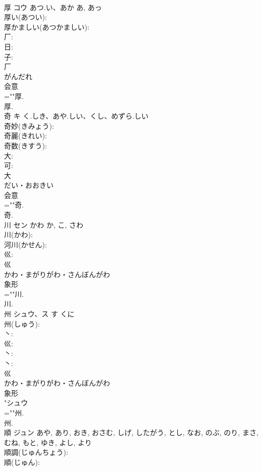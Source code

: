 \documentclass[8pt]{extreport}
\begin{document}
\begin{CJK}{UTF8}{min}
\\	厚	コウ	あつ.い、あか	あ, あっ	
\\	厚い(あつい): 
\\	厚かましい(あつかましい): 
\\	厂: 
\\	日: 
\\	子: 
\\	厂	
\\	がんだれ	
\\	会意 
\\	=""厚.
\\	厚.
\\	奇	キ	く.しき、あや.しい、くし、めずら.しい		
\\	奇妙(きみょう): 
\\	奇麗(きれい): 
\\	奇数(きすう): 
\\	大: 
\\	可: 
\\	大	
\\	だい・おおきい	
\\	会意 
\\	=""奇.
\\	奇.
\\	川	セン	かわ	か, こ, さわ	
\\	川(かわ): 
\\	河川(かせん): 
\\	巛: 
\\	巛	
\\	かわ・まがりがわ・さんぼんがわ	
\\	象形 
\\	=""川.
\\	川.
\\	州	シュウ、ス	す	くに	
\\	州(しゅう): 
\\	丶: 
\\	巛: 
\\	丶: 
\\	丶: 
\\	巛	
\\	かわ・まがりがわ・さんぼんがわ	
\\	象形 
\\	"シュウ　
\\	=""州.
\\	州.
\\	順	ジュン		あや, あり, おき, おさむ, しげ, したがう, とし, なお, のぶ, のり, まさ, むね, もと, ゆき, よし, より	
\\	順調(じゅんちょう): 
\\	順(じゅん): 

\end{CJK}
\end{document}
